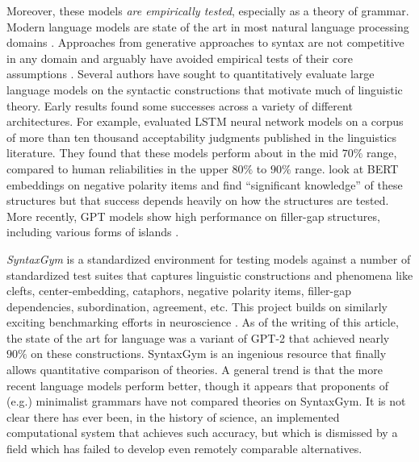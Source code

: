 \documentclass[output=paper,colorlinks,citecolor=brown]{langscibook}
\begin{document}
\begin{sloppypar}
Moreover, these models \textit{are empirically tested}, especially as a theory of grammar. Modern language models are state of the art in most natural language processing domains \citep{bommasani2021opportunities}. Approaches from generative approaches to syntax are not competitive in any domain and arguably have avoided empirical tests of their core assumptions \citep{edelman2003seriously}. Several authors have sought to quantitatively evaluate large language models on the syntactic constructions that motivate much of linguistic theory. Early results found some successes across a variety of different architectures. For example, \citet{warstadt2019neural} evaluated LSTM neural network models on a corpus of more than ten thousand acceptability judgments published in the linguistics literature. They found that these models perform about in the mid $70\%$ range, compared to human reliabilities in the upper $80\%$ to $90\%$ range. \citet{warstadt2019investigating} look at BERT embeddings on negative polarity items and find ``significant knowledge'' of these structures but that success depends heavily on how the structures are tested. More recently, GPT models show high performance on filler-gap structures, including various forms of islands \citep{wilcox2018rnn,wilcox2022using}.
\end{sloppypar}

 \textit{SyntaxGym} is a standardized environment for testing models against a number of standardized test suites that captures linguistic constructions and phenomena like clefts, center-embedding, cataphors, negative polarity items, filler-gap dependencies, subordination, agreement, etc. This project builds on similarly exciting benchmarking efforts in neuroscience \citep{schrimpf2020integrative}. As of the writing of this article, the state of the art for language was a variant of GPT-2 that achieved nearly $90\%$ on these constructions. SyntaxGym is an ingenious resource that finally allows quantitative comparison of theories. A general trend is that the more recent language models perform better, though it appears that proponents of (e.g.) minimalist grammars have not compared theories on SyntaxGym. It is not clear there has ever been, in the history of science, an implemented computational system that achieves such accuracy, but which is dismissed by a field which has failed to develop even remotely comparable alternatives.
\end{document}
